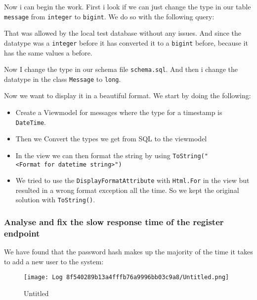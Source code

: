 Now i can begin the work. First i look if we can just change the type in our table \texttt{message} from \texttt{integer} to \texttt{bigint}. We do so with the following query:

\begin{Shaded}
\begin{Highlighting}[]
\end{Highlighting}
\end{Shaded}

That was allowed by the local test database without any issues. And since the datatype was a \texttt{integer} before it has converted it to a \texttt{bigint} before, because it has the same values a before.

Now I change the type in our schema file \texttt{schema.sql}. And then i change the datatype in the class \texttt{Message} to
\texttt{long}.

Now we want to display it in a beautiful format. We start by doing the following:

\begin{itemize}
    \item Create a Viewmodel for messages where the type for a timestamp is \texttt{DateTime}.
    \item Then we Convert the types we get from SQL to the viewmodel
    \item In the view we can then format the string by using \texttt{ToString("\textless{}Format\ for\ datetime\ string\textgreater{}")}
    \item We tried to use the \texttt{DisplayFormatAttribute} with \texttt{Html.For} in the view but resulted in a wrong format exception all the time. So we kept the original solution with \texttt{ToString()}.
\end{itemize}

\subsubsection{Analyse and fix the slow response time of the register endpoint}
\label{log:analyse-and-fix-the-slow-response-time-of-the-register-endpoint}

We have found that the password hash makes up the majority of the time it takes to add a new user to the system:

\begin{figure}
\centering
\texttt{[image: Log 8f540289b13a4fffb76a9996bb03c9a8/Untitled.png]}
\caption{Untitled}
\end{figure}

